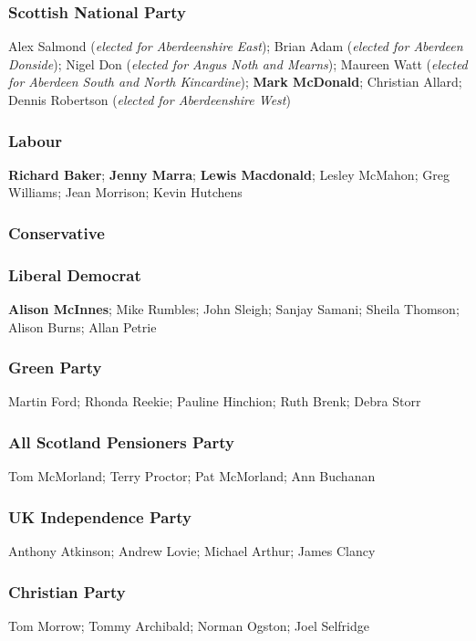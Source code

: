 \begin{resultsiii}
\subsubsection*{Scottish National Party}
Alex Salmond (\emph{elected for Aberdeenshire East}); Brian Adam (\emph{elected for Aberdeen Donside}); Nigel Don (\emph{elected for Angus Noth and Mearns}); Maureen Watt (\emph{elected for Aberdeen South and North Kincardine}); \textbf{Mark McDonald}; Christian Allard; Dennis Robertson (\emph{elected for Aberdeenshire West})
\subsubsection*{Labour}
\textbf{Richard Baker}; \textbf{Jenny Marra}; \textbf{Lewis Macdonald}; Lesley McMahon; Greg Williams; Jean Morrison; Kevin Hutchens
\subsubsection*{Conservative}
\subsubsection*{Liberal Democrat}
\textbf{Alison McInnes}; Mike Rumbles; John Sleigh; Sanjay Samani; Sheila Thomson; Alison Burns; Allan Petrie
\subsubsection*{Green Party}
Martin Ford; Rhonda Reekie; Pauline Hinchion; Ruth Brenk; Debra Storr
\subsubsection*{All Scotland Pensioners Party}
Tom McMorland; Terry Proctor; Pat McMorland; Ann Buchanan
\subsubsection*{UK Independence Party}
Anthony Atkinson; Andrew Lovie; Michael Arthur; James Clancy
\subsubsection*{Christian Party}
Tom Morrow; Tommy Archibald; Norman Ogston; Joel Selfridge

\end{resultsiii}
